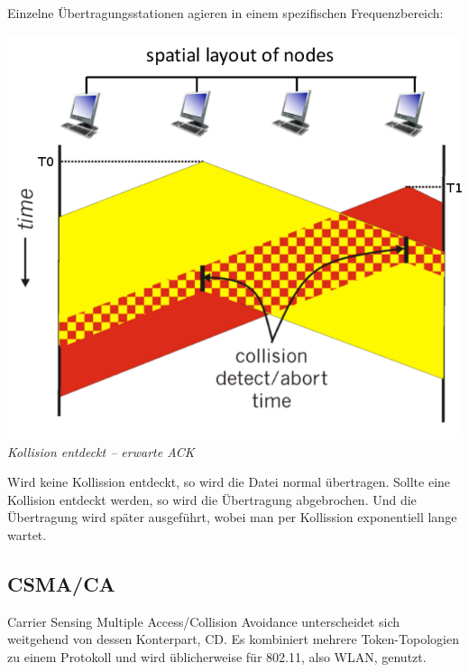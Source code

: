 \documentclass{scrartcl}
\begin{document}
    Einzelne Übertragungsstationen agieren in einem spezifischen Frequenzbereich:
    \begin{center}
        \includegraphics[width=\textwidth]{CSMACD.png}\\
        \textit{Kollision entdeckt -- erwarte ACK}
    \end{center}
    
    Wird keine Kollission entdeckt, so wird die Datei normal übertragen. Sollte eine Kollision entdeckt werden, so wird die Übertragung abgebrochen. Und die Übertragung wird später ausgeführt, wobei man per Kollission exponentiell lange wartet.
    
    \subsection{CSMA/CA}
    Carrier Sensing Multiple Access/Collision Avoidance unterscheidet sich weitgehend von dessen Konterpart, CD.
    Es kombiniert mehrere Token-Topologien zu einem Protokoll und wird üblicherweise für 802.11, also WLAN, genutzt.
    
\end{document}
